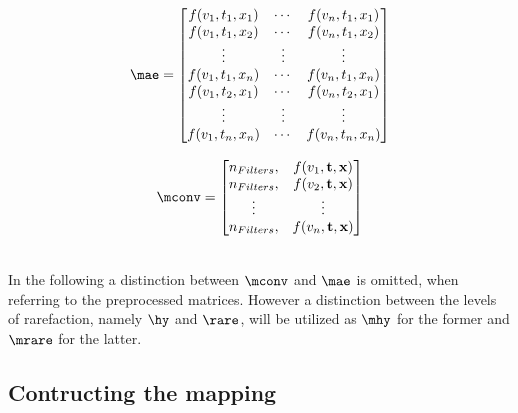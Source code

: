 \begin{minipage}{.55\linewidth}
	\begin{equation}
	\mae = \begin{bmatrix}
	f(v_1,t_1,x_1)&\cdots &f(v_n,t_1,x_1) \\
	f(v_1,t_1,x_2)&\cdots &f(v_n,t_1,x_2) \\
	\vdots& \vdots & \vdots\\
	f(v_1,t_1,x_n)&\cdots &f(v_n,t_1,x_n)\\
	f(v_1,t_2,x_1)&\cdots &f(v_n,t_2,x_1)\\
	\vdots & \vdots & \vdots\\
	f(v_1,t_n,x_n)&\cdots &f(v_n,t_n,x_n)
	\end{bmatrix}
	\label{Eq:AE_matrix}
	\end{equation}
\end{minipage}%
\begin{minipage}{.45\linewidth}
	\begin{equation}
	\mconv= \begin{bmatrix}
	n_{Filters},&f(v_1,\textbf{t},\textbf{x})\\
	n_{Filters},&f(v_2,\textbf{t},\textbf{x})\\
	\vdots&\vdots\\
	n_{Filters},&f(v_n,\textbf{t},\textbf{x})
	\end{bmatrix}
	\label{Eq:CNN_matrix}
	\end{equation}
\end{minipage}\\
In the following a distinction between \(\mconv\) and \(\mae\) is omitted, when referring to the preprocessed matrices. However a distinction between the levels of rarefaction, namely \(\hy\) and \(\rare\), will be utilized as \(\mhy\) for the former and \(\mrare\) for the latter.
\subsection{Contructing the mapping}

